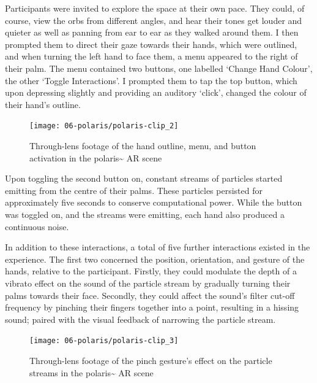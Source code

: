 Participants were invited to explore the space at their own pace. They could, of course, view the orbs from different angles, and hear their tones get louder and quieter as well as panning from ear to ear as they walked around them.
I then prompted them to direct their gaze towards their hands, which were outlined, and when turning the left hand to face them, a menu appeared to the right of their palm. The menu contained two buttons, one labelled `Change Hand Colour', the other `Toggle Interactions'. I prompted them to tap the top button, which upon depressing slightly and providing an auditory `click', changed the colour of their hand's outline.

\begin{figure}[ht]
    \centering
    \texttt{[image: 06-polaris/polaris-clip\_2]}
    \captionsetup{justification=centering,margin=1.5cm}
    \caption{Through-lens footage of the hand outline, menu, and button activation in the polaris\textasciitilde{} AR scene \citep[from][\href{https://youtu.be/lCBgMs8ULj0?t=140}{at 2:20}]{bilbow2022c}}\label{fig: polaris-clip_2}
\end{figure}

Upon toggling the second button on, constant streams of particles started emitting from the centre of their palms. These particles persisted for approximately five seconds to conserve computational power. While the button was toggled on, and the streams were emitting, each hand also produced a continuous noise.

In addition to these interactions, a total of five further interactions existed in the experience. The first two concerned the position, orientation, and gesture of the hands, relative to the participant. Firstly, they could modulate the depth of a vibrato effect on the sound of the particle stream by gradually turning their palms towards their face. Secondly, they could affect the sound's filter cut-off frequency by pinching their fingers together into a point, resulting in a hissing sound; paired with the visual feedback of narrowing the particle stream.

\begin{figure}[ht]
    \centering
    \texttt{[image: 06-polaris/polaris-clip\_3]}
    \captionsetup{justification=centering,margin=1.5cm}
    \caption{Through-lens footage of the pinch gesture’s effect on the particle streams in the polaris\textasciitilde{} AR scene \citep[from][\href{https://youtu.be/lCBgMs8ULj0?t=476}{at 7:56}]{bilbow2022c}}\label{fig: polaris-clip_3}
\end{figure}

